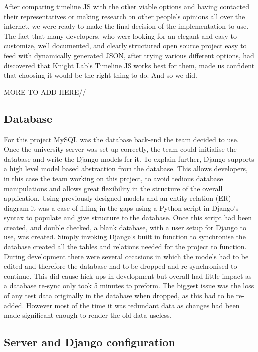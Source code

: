 \documentclass{l3proj}
\begin{document}
After comparing timeline JS with the other viable options and having contacted their representatives or making research on other people's opinions all over the internet, we were ready to make the final decision of the implementation to use. The fact that many developers, who were looking for an elegant and easy to customize, well documented, and clearly structured open source project easy to feed with dynamically generated JSON, after trying various different options, had discovered that Knight Lab’s Timeline JS works best for them, made us confident that choosing it would be the right thing to do. And so we did.

MORE TO ADD HERE//


\subsection{Database}
For this project MySQL was the database back-end the team decided to use.
Once the university server was set-up correctly, the team could initialise the database and write the Django models for it. To explain further, Django supports a high level model based abstraction from the database. This allows developers, in this case the team working on this project, to avoid tedious database manipulations and allows great flexibility in the structure of the overall application. 
Using previously designed models and an entity relation (ER) diagram it was a case of filling in the gaps using a Python script in Django's syntax to populate and give structure to the database.
Once this script had been created, and double checked, a blank database, with a user setup for Django to use, was created. Simply invoking Django's built in function to synchronise the database created all the tables and relations needed for the project to function.
During development there were several occasions in which the models had to be edited and therefore the database had to be dropped and re-synchronised to continue. This did cause hick-ups in development but overall had little impact as a database re-sync only took 5 minutes to preform. The biggest issue was the loss of any test data originally in the database when dropped, as this had to be re-added. However most of the time it was redundant data as changes had been made significant enough to render the old data useless.


\subsection{Server and Django configuration}
\end{document}
